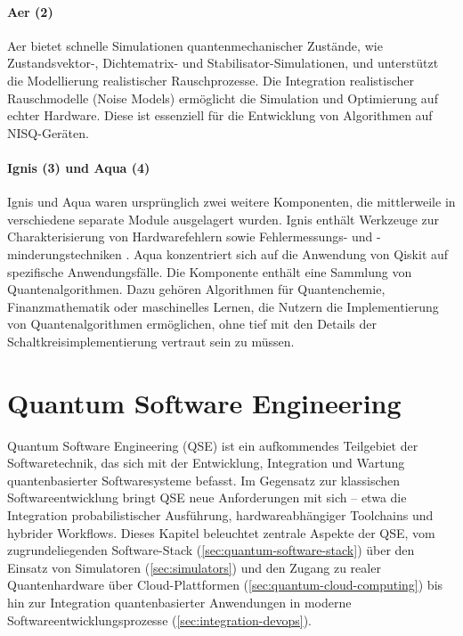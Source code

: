 \paragraph{Aer (2)} Aer bietet schnelle Simulationen quantenmechanischer Zustände, wie Zustandsvektor-, Dichtematrix- und Stabilisator-Simulationen, und unterstützt die Modellierung realistischer Rauschprozesse. Die Integration realistischer Rauschmodelle (Noise Models) ermöglicht die Simulation und Optimierung auf echter Hardware. Diese ist essenziell für die Entwicklung von Algorithmen auf NISQ-Geräten. \autocite{javadi-abhariQuantumComputingQiskit2024a}

\paragraph{Ignis (3) und Aqua (4)} Ignis und Aqua waren ursprünglich zwei weitere Komponenten, die mittlerweile in verschiedene separate Module ausgelagert wurden. Ignis enthält Werkzeuge zur Charakterisierung von Hardwarefehlern sowie Fehlermessungs- und -minderungstechniken \autocite[Vgl.][]{QUELLE ZUR IBM SEITE FEHLT NOCH}. Aqua konzentriert sich auf die Anwendung von Qiskit auf spezifische Anwendungsfälle. Die Komponente enthält eine Sammlung von Quantenalgorithmen. Dazu gehören Algorithmen für Quantenchemie, Finanzmathematik oder maschinelles Lernen, die Nutzern die Implementierung von Quantenalgorithmen ermöglichen, ohne tief mit den Details der Schaltkreisimplementierung vertraut sein zu müssen. \autocite{javadi-abhariQuantumComputingQiskit2024a}

\section{Quantum Software Engineering}

Quantum Software Engineering (QSE) ist ein aufkommendes Teilgebiet der Softwaretechnik, das sich mit der Entwicklung, Integration und Wartung quantenbasierter Softwaresysteme befasst. Im Gegensatz zur klassischen Softwareentwicklung bringt QSE neue Anforderungen mit sich – etwa die Integration probabilistischer Ausführung, hardwareabhängiger Toolchains und hybrider Workflows. \autocite{zhao_quantum-based_2025} Dieses Kapitel beleuchtet zentrale Aspekte der QSE, vom zugrundeliegenden Software-Stack (\autoref{sec:quantum-software-stack}) über den Einsatz von Simulatoren (\autoref{sec:simulators}) und den Zugang zu realer Quantenhardware über Cloud-Plattformen (\autoref{sec:quantum-cloud-computing}) bis hin zur Integration quantenbasierter Anwendungen in moderne Softwareentwicklungsprozesse (\autoref{sec:integration-devops}).

